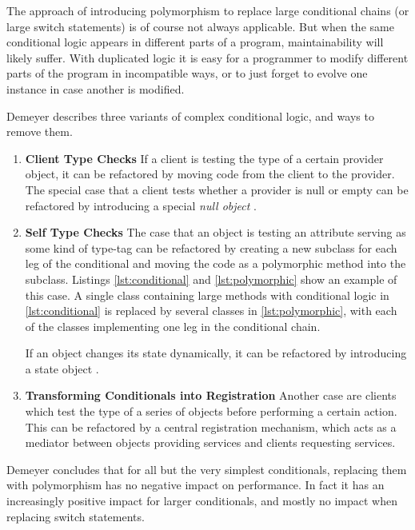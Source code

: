 \documentclass[conference,compsoc,a4paper]{IEEEtran}
\newcommand{\code}[1]{{\small\ttfamily #1}}
\begin{document}
The approach of introducing polymorphism to replace large conditional chains (or large \code{switch} statements) is of 
course not always applicable. But when the same conditional logic appears in different parts of a program, 
maintainability will likely suffer. With duplicated logic it is easy for a programmer to modify different parts of the 
program in incompatible ways, or to just forget to evolve one instance in case another is modified.

Demeyer describes three variants of complex conditional logic, and ways to remove them.

\begin{enumerate}
  \item \textbf{Client Type Checks}
  If a client is testing the type of a certain provider object, it can be refactored by moving code from the client to 
  the provider. The special case that a client tests whether a provider is \code{null} or empty can be refactored by 
  introducing a special \emph{null object} \cite{nullobject}.
  
  \item \textbf{Self Type Checks}
  The case that an object is testing an attribute serving as some kind of type-tag can be refactored by creating a new 
  subclass for each leg of the conditional and moving the code as a polymorphic method into the subclass. Listings 
  \ref{lst:conditional} and \ref{lst:polymorphic} show an example of this case. A single class containing large methods 
  with conditional logic in \autoref{lst:conditional} is replaced by several classes in \autoref{lst:polymorphic}, with 
  each of the classes implementing one leg in the conditional chain.
  
  If an object changes its state dynamically, it can be refactored by introducing a state object   
  \cite[pp.~305--313]{designpatterns}.
  
  \item \textbf{Transforming Conditionals into Registration}
  Another case are clients which test the type of a series of objects before performing a certain action. This can be 
  refactored by a central registration mechanism, which acts as a mediator between objects providing services and 
  clients requesting services.
\end{enumerate}

Demeyer concludes that for all but the very simplest conditionals, replacing them with polymorphism has no negative 
impact on performance. In fact it has an increasingly positive impact for larger conditionals, and mostly no impact 
when replacing \code{switch} statements.
\end{document}
